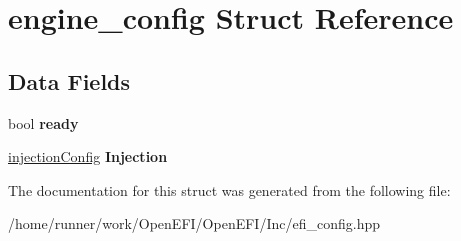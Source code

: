 \hypertarget{structengine__config}{}\section{engine\+\_\+config Struct Reference}
\label{structengine__config}
\subsection*{Data Fields}
\begin{DoxyCompactItemize}
\item 
\mbox{\label{structengine__config_aba57ed41c672ad16c3da5ecd0c4fdbd7}} 
bool {\bfseries ready}
\item 
\mbox{\label{structengine__config_a6afcfd1f78aac3673b67d83fb2df121e}} 
\hyperlink{structinjectionConfig}{injection\+Config} {\bfseries Injection}
\end{DoxyCompactItemize}


The documentation for this struct was generated from the following file\+:\begin{DoxyCompactItemize}
\item 
/home/runner/work/\+Open\+E\+F\+I/\+Open\+E\+F\+I/\+Inc/efi\+\_\+config.\+hpp\end{DoxyCompactItemize}

